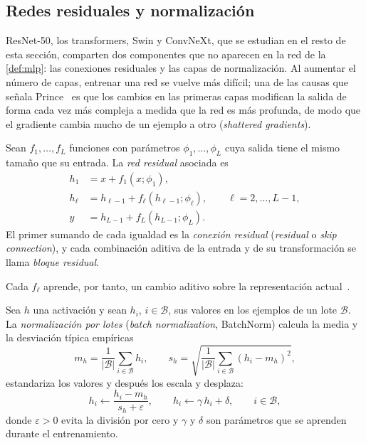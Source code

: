 \subsection{Redes residuales y normalización}\label{sec:residuales}

ResNet-50, los transformers, Swin y ConvNeXt, que se estudian en el resto de
esta sección, comparten dos componentes que no aparecen en la red de la
\cref{def:mlp}: las conexiones residuales y las capas de normalización. Al
aumentar el número de capas, entrenar una red se vuelve más difícil; una de las
causas que señala Prince~\cite[sec.~11.1]{prince2023understanding} es que los
cambios en las primeras capas modifican la salida de forma cada vez más compleja
a medida que la red es más profunda, de modo que el gradiente cambia mucho de un
ejemplo a otro (\emph{shattered gradients}).

\begin{definicion}\label{def:residual}
Sean $f_1,\dots,f_L$ funciones con parámetros $\phi_1,\dots,\phi_L$ cuya salida
tiene el mismo tamaño que su entrada. La \emph{red residual} asociada es
\begin{align*}
  h_1 &= x + f_1(x;\phi_1),\\
  h_\ell &= h_{\ell-1} + f_\ell(h_{\ell-1};\phi_\ell), \qquad \ell = 2,\dots,L-1,\\
  y   &= h_{L-1} + f_L(h_{L-1};\phi_L).
\end{align*}
El primer sumando de cada igualdad es la \emph{conexión residual}
(\emph{residual} o \emph{skip connection}), y cada combinación aditiva de la
entrada y de su transformación se llama \emph{bloque residual}.
\end{definicion}

Cada $f_\ell$ aprende, por tanto, un cambio aditivo sobre la representación
actual~\cite[sec.~11.2]{prince2023understanding}.

\begin{definicion}\label{def:batchnorm}
Sea $h$ una activación y sean $h_i$, $i\in\mathcal{B}$, sus valores en los
ejemplos de un lote $\mathcal{B}$. La \emph{normalización por lotes}
(\emph{batch normalization}, BatchNorm) calcula la media y la desviación típica
empíricas
\[
  m_h = \frac{1}{|\mathcal{B}|}\sum_{i\in\mathcal{B}} h_i, \qquad
  s_h = \sqrt{\frac{1}{|\mathcal{B}|}\sum_{i\in\mathcal{B}} (h_i - m_h)^2},
\]
estandariza los valores y después los escala y desplaza:
\[
  h_i \leftarrow \frac{h_i - m_h}{s_h + \varepsilon}, \qquad
  h_i \leftarrow \gamma\, h_i + \delta, \qquad i\in\mathcal{B},
\]
donde $\varepsilon > 0$ evita la división por cero y $\gamma$ y $\delta$ son
parámetros que se aprenden durante el entrenamiento.
\end{definicion}

